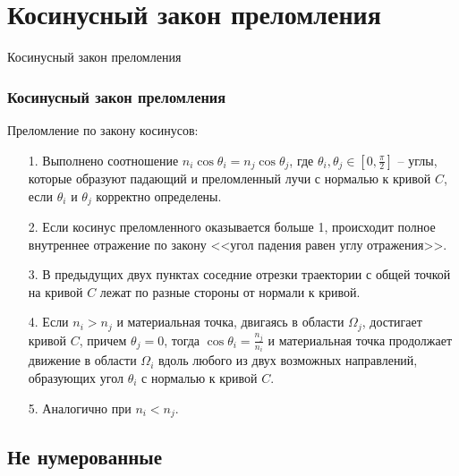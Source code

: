 

\section{Косинусный закон преломления}
\begin{frame}
    \begin{center}
        \Huge
        Косинусный закон преломления
    \end{center}
\end{frame}

\begin{frame}\frametitle{Косинусный закон преломления}


\qq Преломление по закону косинусов: 
\begin{itemize}
\item[1.] Выполнено соотношение $n_i \cos \theta_i = n_j \cos \theta_j $, где $\theta_i, \theta_j \in [0,\frac{\pi}{2} ]$ -- углы, которые образуют падающий и преломленный лучи с нормалью к кривой $C$, если $\theta_i$ и $\theta_j$ корректно определены.
\item[2.] Если косинус преломленного оказывается больше 1, происходит полное внутреннее отражение по закону <<угол падения равен углу отражения>>.
\item[3.] В предыдущих двух пунктах  соседние отрезки траектории с общей точкой на кривой $C$ лежат по разные стороны от нормали к кривой.
\item[4.] Если $n_i > n_j$ и материальная точка, двигаясь в области $\Omega_j$, достигает кривой $C$, причем $\theta_j = 0$, тогда $\cos \theta_i = \frac{n_j}{n_i}$ и материальная точка продолжает движение в области $\Omega_i$ вдоль любого из двух возможных направлений, образующих угол $\theta_i$ с нормалью к кривой $C$.
\item[5.] Аналогично при $n_i < n_j$.
\end{itemize}
\end{frame}

\subsection{Не нумерованные}


